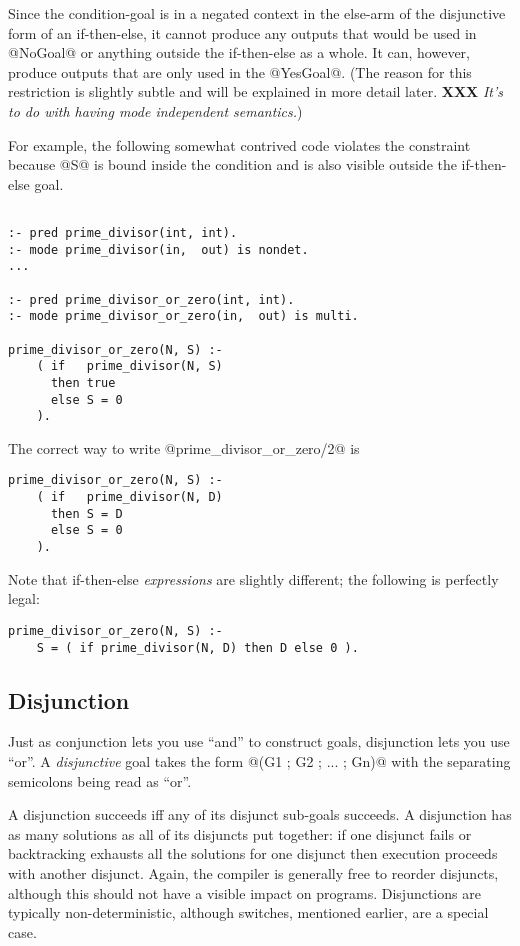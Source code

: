 \documentclass[a4paper,11pt,notitlepage,onecolumn]{article}
\newcommand{\XXX}[1]%
{{\small\textbf{XXX} \emph{#1}}}
\begin{document}
Since the condition-goal is in a negated context in the else-arm
of the disjunctive form of an if-then-else, it cannot
produce any outputs that would be used in @NoGoal@ or anything
outside the if-then-else as a whole.  It can, however, produce
outputs that are only used in the @YesGoal@.  (The reason for
this restriction is slightly subtle and will be explained in
more detail later.  \XXX{It's to do with having mode
independent semantics.})

For example, the following somewhat contrived code violates
the constraint because @S@ is bound inside the condition and is
also visible outside the if-then-else goal.
\begin{verbatim}

:- pred prime_divisor(int, int).
:- mode prime_divisor(in,  out) is nondet.
...

:- pred prime_divisor_or_zero(int, int).
:- mode prime_divisor_or_zero(in,  out) is multi.

prime_divisor_or_zero(N, S) :-
    ( if   prime_divisor(N, S)
      then true
      else S = 0
    ).

\end{verbatim}
The correct way to write @prime_divisor_or_zero/2@ is
\begin{verbatim}
prime_divisor_or_zero(N, S) :-
    ( if   prime_divisor(N, D)
      then S = D
      else S = 0
    ).
\end{verbatim}
Note that if-then-else \emph{expressions} are slightly different;
the following is perfectly legal:
\begin{verbatim}
prime_divisor_or_zero(N, S) :-
    S = ( if prime_divisor(N, D) then D else 0 ).
\end{verbatim}

\subsection{Disjunction}

Just as conjunction lets you use ``and'' to construct goals,
disjunction lets you use ``or''.  A \emph{disjunctive} goal takes the
form @(G1 ; G2 ; ... ; Gn)@ with the separating semicolons being
read as ``or''.

A disjunction succeeds iff any of its disjunct sub-goals
succeeds.  A disjunction has as many solutions as all of its
disjuncts put together: if one disjunct fails or backtracking
exhausts all the solutions for one disjunct then execution
proceeds with another disjunct.  Again, the compiler is
generally free to reorder disjuncts, although this should not
have a visible impact on programs.  Disjunctions are typically
non-deterministic, although switches, mentioned earlier, are a
special case.
\end{document}
